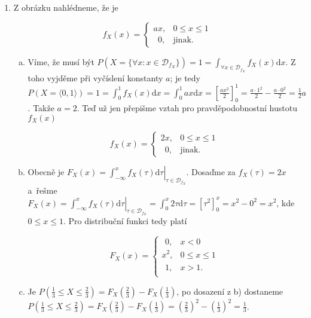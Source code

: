 ﻿\documentclass{article}
\begin{document}
\begin{enumerate}[1)]
\item Z obrázku nahlédneme, že je

\begin{equation*}
f_{X}(x) = \left\{
\begin{array}{ll}
ax, & 0 \leq x \leq 1 \\
\phantom{a}0, & \text{jinak}.
\end{array} \right.
\end{equation*}

\begin{enumerate}[a)]

\item Víme, že musí být $P(X = \{\forall x: x \in \mathcal{D}_{f_{X}}\}) = 1 = \int_{\forall x \in \mathcal{D}_{f_{X}}} f_{X}(x) \text{d}x$. Z toho vyjděme při vyčíslení konstanty $a$; je tedy $P(X = \langle 0, 1 \rangle) = 1 = \int_{0}^{1} f_{X}(x) \text{d}x = \int_{0}^{1} ax \text{d}x = \left[ \frac{ax^{2}}{2} \right]_{0}^{1} = \frac{a \cdot 1^{2}}{2} - \frac{a \cdot 0^{2}}{2} = \frac{1}{2}a$. Takže $a = 2$. Teď už jen přepišme vztah pro pravděpodobnostní hustotu $f_{X}(x)$

\begin{equation*}
f_{X}(x) = \left\{
\begin{array}{ll}
2x, & 0 \leq x \leq 1 \\
\phantom{2}0, & \text{jinak}.
\end{array} \right.
\end{equation*}

\item Obecně je $F_{X}(x) = \left. \int_{-\infty}^{x} f_{X}(\tau) \text{d}\tau \right\rvert_{\tau \in \mathcal{D}_{f_{X}}}$. Dosaďme za $f_{X}(\tau) = 2x$ \mbox{a řešme} $F_{X}(x) = \left. \int_{-\infty}^{x} f_{X}(\tau) \text{d}\tau \right\rvert_{\tau \in \mathcal{D}_{f_{X}}} = \int_{0}^{x} 2\tau \text{d}\tau = \left[ \tau^{2} \right]_{0}^{x} = x^{2} - 0^{2} = x^{2}$, kde $0 \leq x \leq 1$. Pro distribuční funkci tedy platí

\begin{equation*}
F_{X}(x) = \left\{
\begin{array}{ll}
\phantom{^{2}}0, & x < 0 \\
x^{2}, & 0 \leq x \leq 1 \\
\phantom{^{2}}1, & x > 1 .\\
\end{array} \right.
\end{equation*}

\item Je $P\left(\frac{1}{3} \leq X \leq \frac{2}{3} \right) = F_{X}\left(\frac{2}{3} \right) - F_{X}\left(\frac{1}{3} \right)$, po dosazení z b) dostaneme $P\left(\frac{1}{3} \leq X \leq \frac{2}{3} \right) = F_{X}\left(\frac{2}{3} \right) - F_{X}\left(\frac{1}{3} \right) = \left(\frac{2}{3}\right)^{2} - \left(\frac{1}{3}\right)^{2} = \frac{1}{3}$.


\end{enumerate}
\end{enumerate}
\end{document}
